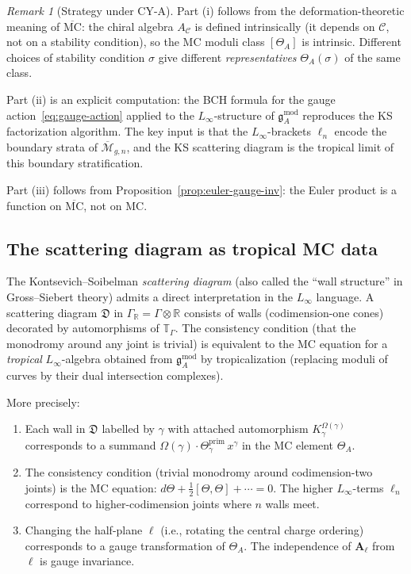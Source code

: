 \documentclass[11pt]{article}
\theoremstyle{definition}
\theoremstyle{remark}
\newtheorem{remark}[theorem]{Remark}
\newcommand{\frakg}{\mathfrak{g}}
\newcommand{\Linf}{L_\infty}
\newcommand{\MC}{\mathrm{MC}}
\newcommand{\cC}{\mathcal{C}}
\newcommand{\cM}{\mathcal{M}}
\begin{document}
\begin{remark}[Strategy under CY-A]
Part (i) follows from the deformation-theoretic meaning of
$\overline{\MC}$: the chiral algebra $A_\cC$ is defined intrinsically
(it depends on $\cC$, not on a stability condition), so the MC moduli
class $[\Theta_A]$ is intrinsic. Different choices of stability condition
$\sigma$ give different \emph{representatives} $\Theta_A(\sigma)$ of
the same class.

Part (ii) is an explicit computation: the BCH formula for the gauge
action~\eqref{eq:gauge-action} applied to the $\Linf$-structure of
$\frakg^{\mathrm{mod}}_A$ reproduces the KS factorization algorithm.
The key input is that the $\Linf$-brackets $\ell_n$ encode the
boundary strata of $\overline{\cM}_{g,n}$, and the KS scattering
diagram is the tropical limit of this boundary stratification.

Part (iii) follows from Proposition~\ref{prop:euler-gauge-inv}: the
Euler product is a function on $\overline{\MC}$, not on $\MC$.
\end{remark}

\subsection{The scattering diagram as tropical MC data}
\label{ssec:scattering}

The Kontsevich--Soibelman \emph{scattering diagram} (also called the
``wall structure'' in Gross--Siebert theory) admits a direct
interpretation in the $\Linf$ language. A scattering diagram
$\mathfrak{D}$ in $\Gamma_\mathbb{R} = \Gamma \otimes \mathbb{R}$
consists of walls (codimension-one cones) decorated by automorphisms of
$\mathbb{T}_\Gamma$. The consistency condition (that the
monodromy around any joint is trivial) is equivalent to the MC
equation for a \emph{tropical} $\Linf$-algebra obtained from
$\frakg^{\mathrm{mod}}_A$ by tropicalization (replacing moduli of curves
by their dual intersection complexes).

More precisely:

\begin{enumerate}[label=(\arabic*)]
\item Each wall in $\mathfrak{D}$ labelled by $\gamma$ with attached
 automorphism $K_\gamma^{\Omega(\gamma)}$ corresponds to a summand
 $\Omega(\gamma) \cdot \Theta_\gamma^{\mathrm{prim}} \, x^\gamma$ in
 the MC element $\Theta_A$.

\item The consistency condition (trivial monodromy around codimension-two
 joints) is the MC equation: $d\Theta + \frac{1}{2}[\Theta, \Theta]
 + \cdots = 0$. The higher $\Linf$-terms $\ell_n$ correspond to
 higher-codimension joints where $n$ walls meet.

\item Changing the half-plane $\ell$ (i.e., rotating the central charge
 ordering) corresponds to a gauge transformation of $\Theta_A$. The
 independence of $\mathbf{A}_\ell$ from $\ell$ is gauge invariance.
\end{enumerate}
\end{document}
